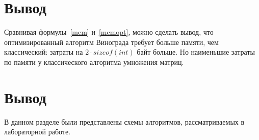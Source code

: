 \section*{Вывод}

Сравнивая формулы~\ref{mem} и~\ref{memopt}, можно сделать вывод, что оптимизированный алгоритм Винограда требует больше памяти, чем классический: затраты на $2\cdot sizeof(int)$ байт больше. Но наименьшие затраты по памяти у классического алгоритма умножения матриц.

\section{Вывод}

В данном разделе были представлены схемы алгоритмов, рассматриваемых в лабораторной работе.